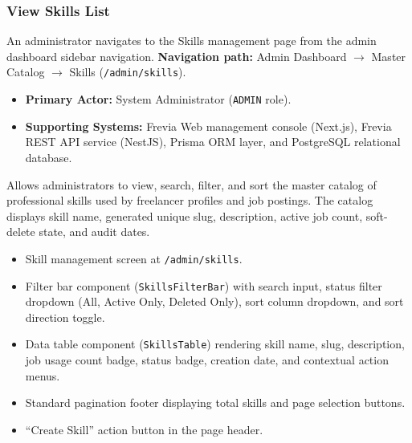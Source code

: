 \subsubsection{ View Skills List}

An administrator navigates to the Skills management page from the admin dashboard sidebar navigation.\newline
\textbf{Navigation path:} Admin Dashboard $\rightarrow$ Master Catalog $\rightarrow$ Skills (\texttt{/admin/skills}).


\begin{itemize}[leftmargin=1.6em,topsep=3pt,itemsep=2pt,parsep=0pt,label=$\bullet$]
    \item \textbf{Primary Actor:} System Administrator (\texttt{ADMIN} role).
    \item \textbf{Supporting Systems:} Frevia Web management console (Next.js), Frevia REST API service (NestJS), Prisma ORM layer, and PostgreSQL relational database.
\end{itemize}

\noindent Allows administrators to view, search, filter, and sort the master catalog of professional skills used by freelancer profiles and job postings. The catalog displays skill name, generated unique slug, description, active job count, soft-delete state, and audit dates.

\begin{itemize}[leftmargin=1.6em,topsep=3pt,itemsep=2pt,parsep=0pt,label=$\bullet$]
    \item Skill management screen at \texttt{/admin/skills}.
    \item Filter bar component (\texttt{SkillsFilterBar}) with search input, status filter dropdown (All, Active Only, Deleted Only), sort column dropdown, and sort direction toggle.
    \item Data table component (\texttt{SkillsTable}) rendering skill name, slug, description, job usage count badge, status badge, creation date, and contextual action menus.
    \item Standard pagination footer displaying total skills and page selection buttons.
    \item ``Create Skill'' action button in the page header.
\end{itemize}

